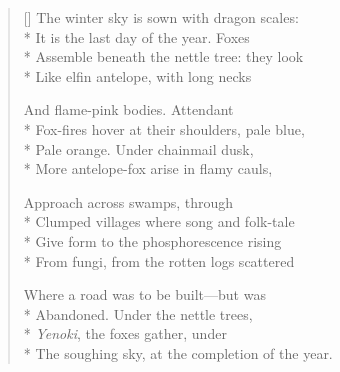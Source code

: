 \label{ch:magic_foxes}
\settowidth{\versewidth}{The soughing sky, at the completion of the year.}
\begin{verse}[\versewidth]
The winter sky is sown with dragon scales:\\*
It is the last day of the year. \qquad  Foxes\\*
Assemble beneath the nettle tree:  they look\\*
Like elfin antelope, with long necks

And flame-pink bodies. \qquad Attendant\\*
Fox-fires hover at their shoulders, pale blue,\\*
Pale orange.  Under chainmail dusk,\\*
More antelope-fox arise in flamy cauls,

Approach across swamps, through \\*
Clumped villages where song and folk-tale\\*
Give form to the phosphorescence rising\\*
From fungi, from the rotten logs scattered

Where a road was to be built---but was\\*
Abandoned.  Under the nettle trees,\\*
\textit{Yenoki}, the foxes gather, under\\*
The soughing sky, at the completion of the year.
\end{verse}
